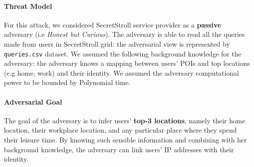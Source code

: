 \documentclass[10pt,conference,compsocconf]{IEEEtran}
\begin{document}
\paragraph{Threat Model}
For this attack, we considered SecretStroll service provider as a \textbf{passive} adversary (i.e \textit{Honest
but Curious}). The adversary is able to read all the queries made from users in SecretStroll grid: the adversarial view is
represented by \texttt{queries.csv} dataset.
We assumed the following background knowledge for the adversary: the adversary
knows a mapping between users' POIs and top locations (e.g home, work) and their identity.\newline
We assumed the adversary computational power to be bounded by Polynomial time.


\paragraph{Adversarial Goal}
The goal of the adversary is to infer users' \textbf{top-3 locations}, namely
their home location, their workplace location, and any particular place where
they spend their leisure time. By knowing such sensible information and
combining with her background knowledge, the adversary can link users' IP addresses with their identity.
\end{document}
